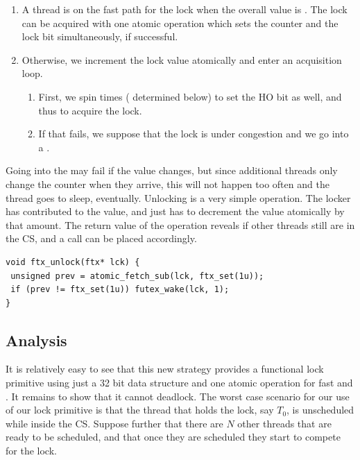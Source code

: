 \itemadjust
\begin{enumerate}
\item A thread is on the fast path for the lock when the overall value
is . The lock can be acquired with one atomic operation which sets
the counter and the lock bit simultaneously, if successful.
\itemadjust
\item Otherwise, we increment the lock value atomically and enter an
  acquisition loop.\itemadjust
\begin{enumerate}
\item First, we spin  times
\iflong%
( determined below) to set the HO
bit as well, and thus
\else%
to
\fi%
acquire the lock.
\item If that fails,
\iflong%
we suppose that the lock is under congestion and
\fi%
we go into a .
\itemadjust
\end{enumerate}
\end{enumerate}
\iflong%
Going into the  may fail if the value changes, but
since additional threads only change the counter when they arrive,
this will not happen too often and the thread goes to sleep,
eventually.
\fi%
Unlocking is a very simple operation. The locker has contributed
 to the value, and just has to decrement the value
atomically by that amount.  The return value of the operation
reveals if other threads still are in the CS, and a
 call can be placed accordingly.
\iflong%
\lstset{language=C11,label= ,caption= ,numbers=none}
\begin{lstlisting}
void ftx_unlock(ftx* lck) {
 unsigned prev = atomic_fetch_sub(lck, ftx_set(1u));
 if (prev != ftx_set(1u)) futex_wake(lck, 1);
}
\end{lstlisting}
\fi

\subsection{Analysis}
\label{sec-3-2}

It is relatively easy to see that this new strategy provides a
functional lock primitive using just a 32 bit data structure and
one atomic operation for fast  and . It remains to
show that it cannot deadlock.
\iflong%
The worst case scenario for our use of our lock primitive is that
the thread that holds the lock, say $T_0$, is unscheduled while
inside the CS. Suppose further that there are $N$ other threads
that are ready to be scheduled, and that once they are scheduled
they start to compete for the lock.

